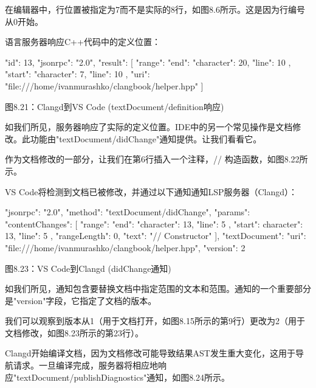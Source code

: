 在编辑器中，行位置被指定为7而不是实际的8行，如图8.6所示。这是因为行编号从0开始。

语言服务器响应C++代码中的定义位置：

\begin{shell}
{
  "id": 13,
  "jsonrpc": "2.0",
  "result": [
  {
    "range": {
      "end": {
        "character": 20,
        "line": 10
      },
      "start": {
        "character": 7,
        "line": 10
      }
    },
    "uri": "file:///home/ivanmurashko/clangbook/helper.hpp"
  }
  ]
}
\end{shell}

\begin{center}
图8.21：Clangd到VS Code (textDocument/definition响应)
\end{center}

如我们所见，服务器响应了实际的定义位置。IDE中的另一个常见操作是文档修改。此功能由"textDocument/didChange"通知提供。让我们看看它。



作为文档修改的一部分，让我们在第6行插入一个注释，// 构造函数，如图8.22所示。


VS Code将检测到文档已被修改，并通过以下通知通知LSP服务器（Clangd）：

\begin{shell}
{
  "jsonrpc": "2.0",
  "method": "textDocument/didChange",
  "params": {
    "contentChanges": [
      {
        "range": {
          "end": {
            "character": 13,
            "line": 5
          },
          "start": {
            character": 13,
            "line": 5
          }
        },
        "rangeLength": 0,
        "text": "// Constructor"
      }
    ],
    "textDocument": {
      "uri": "file:///home/ivanmurashko/clangbook/helper.hpp",
      "version": 2
    }
  }
}
\end{shell}

\begin{center}
图8.23：VS Code到Clangd (didChange通知)
\end{center}

如我们所见，通知包含要替换文档中指定范围的文本和范围。通知的一个重要部分是"version"字段，它指定了文档的版本。

我们可以观察到版本从1（用于文档打开，如图8.15所示的第9行）更改为2（用于文档修改，如图8.23所示的第23行）。

Clangd开始编译文档，因为文档修改可能导致结果AST发生重大变化，这用于导航请求。一旦编译完成，服务器将相应地响应"textDocument/publishDiagnostics"通知，如图8.24所示。

